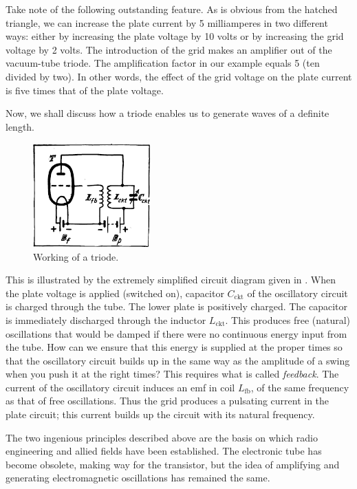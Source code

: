 Take note of the following outstanding feature. As is obvious from the hatched triangle, we can increase the plate current by 5 milliamperes in two different ways: either by increasing the plate voltage by 10 volts or by increasing the grid voltage by 2 volts. The introduction of the grid makes an amplifier out of the vacuum-tube triode. The amplification factor in our example equals 5 (ten divided by two). In other words, the effect of the grid voltage on the plate current is five times that of the plate voltage.

Now, we shall discuss how a triode enables us to generate waves of a definite length.

\begin{figure}[!ht]
\centering
\includegraphics[width=0.4\textwidth]{figures/fig-06-07.pdf}
\caption{Working of a triode.}
\label{fig-6.7}
\end{figure}

This is illustrated by the extremely simplified circuit diagram given in . When the plate voltage is applied (switched on), capacitor $C_{\textrm{ckt}}$ of the oscillatory circuit is charged through the tube. The lower plate is positively charged. The capacitor is immediately discharged through the inductor $L_{\textrm{ckt}}$. This produces free (natural) oscillations that would be damped if there were no continuous energy input from the tube. How can we ensure that this energy is supplied at the proper times so that the oscillatory circuit builds up in the same way as the amplitude of a swing when you push it at the right times? This requires what is called \emph{feedback}. The current of the oscillatory circuit induces an emf in coil $L_{\textrm{fb}}$, of the same frequency as that of free oscillations. Thus the grid produces a pulsating current in the plate circuit; this current builds up the circuit with its natural frequency.



The two ingenious principles described above are the basis on which radio engineering and allied fields have been established. The electronic tube has become obsolete, making way for the transistor, but the idea of amplifying and generating electromagnetic oscillations has remained the same.

